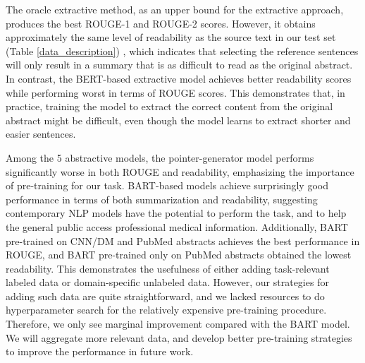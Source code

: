 \documentclass[letterpaper, table]{article} %
\begin{document}
The oracle extractive method, as an upper bound for the extractive approach, produces the best ROUGE-1 and ROUGE-2 scores. However, it obtains approximately the same level of readability as the source text in our test set (Table \ref{data_description})
, which indicates that selecting the reference sentences will only result in a summary that is as difficult to read as the original abstract.
In contrast, the BERT-based extractive model achieves better readability scores while performing worst in terms of ROUGE scores. This demonstrates that, in practice, training the model to extract the correct content from the original abstract might be difficult, even though the model learns to extract shorter and easier sentences.

Among the 5 abstractive models, the pointer-generator model performs significantly worse in both ROUGE and readability, emphasizing the importance of pre-training for our task.
BART-based models achieve surprisingly good performance in terms of both summarization and readability, suggesting contemporary NLP models have the potential to perform the task, and to help the general public access professional medical information. Additionally, BART pre-trained on CNN/DM and PubMed abstracts achieves the best performance in ROUGE, and BART pre-trained only on PubMed abstracts obtained the lowest readability.
This demonstrates the usefulness of either adding task-relevant labeled data or domain-specific unlabeled data. However, our strategies for adding such data are quite straightforward, and we lacked resources to do hyperparameter search for the relatively expensive pre-training procedure. Therefore, we only see marginal improvement compared with the BART model. We will aggregate more relevant data, and develop better pre-training strategies to improve the performance in future work.
\end{document}
